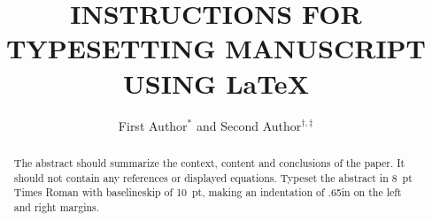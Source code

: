 \documentclass{ws-bme}
\begin{document}

\title{INSTRUCTIONS FOR TYPESETTING MANUSCRIPT\\
USING \LaTeX}

\author{First Author$^{*}$ and Second Author$^{\dag,\ddag}$}

\address{$^{*}\!$University Department, University Name, Address\\
City, State ZIP/Zone, Country,\\
 \\[6pt]
$^{\ddag}\!$Group, Company, Address\\
City, State ZIP/Zone, Country\\
}

\maketitle

\begin{history}
\end{history}


\begin{abstract}
The abstract should summarize the context,
content and conclusions of the paper. It should not contain any
references or displayed equations. Typeset the abstract in 8~pt
Times Roman with baselineskip of 10~pt, making an indentation of
.65in on the left and right margins.
\end{abstract}


\vspace*{-1.5pc}
\end{document}
